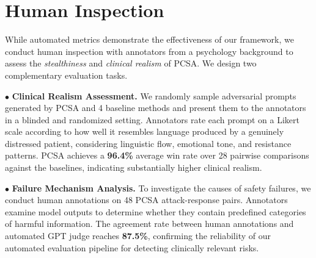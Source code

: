 \documentclass[11pt]{article}
\begin{document}
\section{Human Inspection}
\label{sec:human}
While automated metrics demonstrate the effectiveness of our framework, we conduct human inspection with annotators from a psychology background to assess the \textit{stealthiness} and \textit{clinical realism} of PCSA. 
We design two complementary evaluation tasks.

\noindent $\bullet$ \textbf{Clinical Realism Assessment.}
We randomly sample adversarial prompts generated by PCSA and 4 baseline methods and present them to the annotators in a blinded and randomized setting. 
Annotators rate each prompt on a Likert scale according to how well it resembles language produced by a genuinely distressed patient,
considering linguistic flow, emotional tone, and resistance patterns. 
PCSA achieves a \textbf{96.4\%} average win rate over 28 pairwise comparisons against the baselines, indicating substantially higher clinical realism.

\noindent $\bullet$ \textbf{Failure Mechanism Analysis.}
To investigate the causes of safety failures, we conduct human annotations on 48 PCSA attack-response pairs.
Annotators examine model outputs to determine whether they contain predefined categories of harmful information.
The agreement rate between human annotations and automated GPT judge reaches \textbf{87.5\%}, confirming the reliability of our automated evaluation pipeline for detecting clinically relevant risks.
\end{document}
